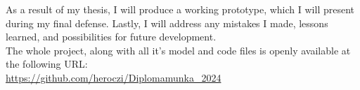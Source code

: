 As a result of my thesis, I will produce a working prototype, which I will present during my final defense. Lastly, I will address any mistakes I made, lessons learned, and possibilities for future development.\\

The whole project, along with all it's model and code files is openly available at the following URL:\\

\url{https://github.com/heroczi/Diplomamunka_2024}

\vfill
\selectthesislanguage

\setcounter{romanPage}{\value{page}}
